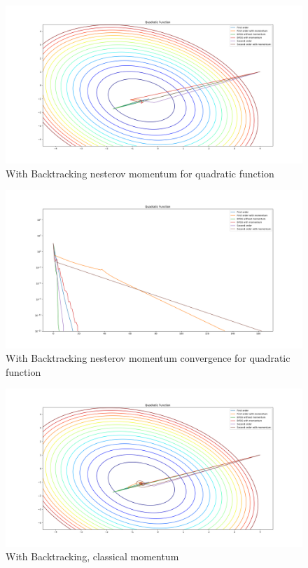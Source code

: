 \documentclass{article}
\begin{document}
\begin{center}
\begin{figure}[H]
	\includegraphics[width=\linewidth]{../Images/quadraticnesterovbacktrack.png}
	\caption{With Backtracking nesterov momentum for quadratic function}
	\label{fig:With Backtracking nesterov momentum for quadratic function}
\end{figure}

\begin{figure}[H]
	\includegraphics[width=\linewidth]{../Images/quadraticnesterovbacktrack1.png}
	\caption{With Backtracking nesterov momentum convergence for quadratic function}
	\label{fig:With Backtracking nesterov momentum convergence for quadratic function}
\end{figure}

\begin{figure}[H]
	\includegraphics[width=\linewidth]{../Images/quadraticmomentumbacktrack.png}
	\caption{With Backtracking, classical momentum}
	\label{fig:With Backtracking, classical momentum for quadratic function}
\end{figure}


\end{center}
\end{document}
